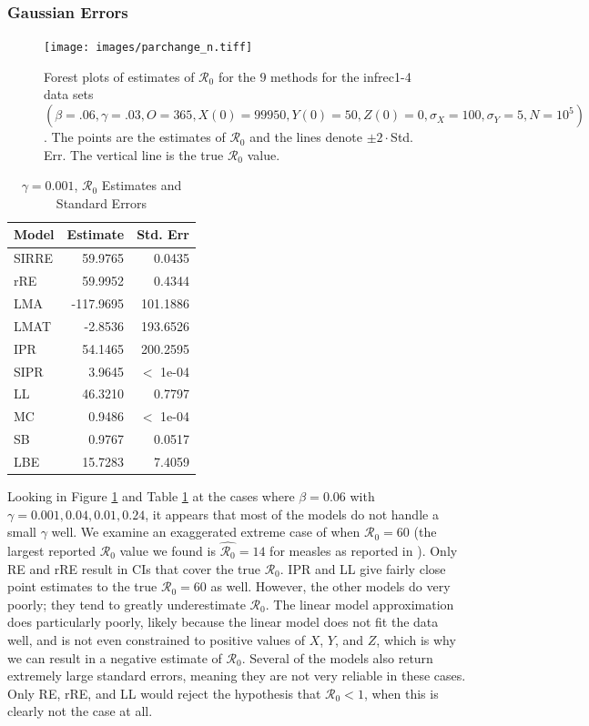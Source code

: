 \documentclass[12pt]{article}
\newcommand{\xxsir}{\ensuremath{9} } %
\newcommand{\rr}{\ensuremath{\mathcal{R}_0}}
\begin{document}
\subsubsection{Gaussian Errors}

\begin{figure}[H]
  \centering
  \texttt{[image: images/parchange\_n.tiff]}
  \caption{Forest plots of estimates of $\rr$ for the \xxsir methods for the infrec1-4 data sets $(\beta=.06, \gamma=.03, O=365, X(0)=99950, Y(0)=50, Z(0)=0, \sigma_X=100, \sigma_Y=5, N=10^5)$.  The points are the estimates of $\rr$ and the lines denote $\pm 2\cdot $Std. Err.  The vertical line is the true $\rr$ value.}
  \label{fig:infrec1-res}
\end{figure}
\begin{table}[H]

	\centering
	\begin{tabular}[t]{l|r|r}
		\hline
		Model & Estimate & Std. Err\\
		\hline
		SIRRE & 59.9765 & 0.0435\\
		\hline
		rRE & 59.9952 & 0.4344\\
		\hline
		LMA &  -117.9695 & 101.1886 \\
		\hline
		LMAT & -2.8536 & 193.6526 \\
		\hline
		IPR & 54.1465 & 200.2595\\
		\hline
		SIPR & 3.9645 & $<$ 1e-04\\
		\hline
		LL & 46.3210 & 0.7797\\
		\hline
		MC & 0.9486 & $<$ 1e-04 \\
		\hline
		SB & 0.9767 & 0.0517\\
		\hline
		LBE & 15.7283 & 7.4059\\
		\hline
	\end{tabular}
        \caption{\label{tab:infrec1-res}$\gamma = 0.001$, $\rr$ Estimates and Standard Errors}
\end{table}

Looking in Figure \ref{fig:infrec1-res} and Table \ref{tab:infrec1-res} at the cases where $\beta = 0.06$ with $\gamma = 0.001, 0.04, 0.01, 0.24$, it appears that most of the models do not handle a small $\gamma$ well.  We examine an exaggerated extreme case of when $\rr=60$ (the largest reported $\rr$ value we found is $\hat{\rr}=14$ for measles as reported in \cite{anderson1992}). Only RE and rRE result in CIs that cover the true $\rr$. IPR and LL give fairly close point estimates to the true $\rr=60$ as well. However, the other models do very poorly; they tend to greatly underestimate $\rr$. The linear model approximation does particularly poorly, likely because the linear model does not fit the data well, and is not even constrained to positive values of $X$, $Y$, and $Z$, which is why we can result in a negative estimate of $\rr$. Several of the models also return extremely large standard errors, meaning they are not very reliable in these cases.  Only RE, rRE, and LL would reject the hypothesis that $\rr <1$, when this is clearly not the case at all.
\end{document}
